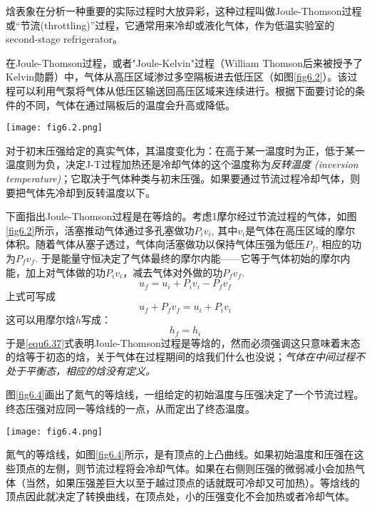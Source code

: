 焓表象在分析一种重要的实际过程时大放异彩，这种过程叫做Joule-Thomson过程或“节流(throttling)”过程，它通常用来冷却或液化气体，作为低温实验室的second-stage refrigerator。

在Joule-Thomson过程，或者"Joule-Kelvin"过程（William Thomson后来被授予了Kelvin勋爵）中，气体从高压区域渗过多空隔板进去低压区（如图\ref{fig6.2}）。该过程可以利用气泵将气体从低压区输送回高压区域来连续进行。根据下面要讨论的条件的不同，气体在通过隔板后的温度会升高或降低。

{
	\centering
	\texttt{[image: fig6.2.png]}
	\label{fig6.2}
}

对于初末压强给定的真实气体，其温度变化为：在高于某一温度时为正，低于某一温度则为负，决定J-T过程加热还是冷却气体的这个温度称为{\it 反转温度 (inversion temperature)}；它取决于气体种类与初末压强。如果要通过节流过程冷却气体，则要把气体先冷却到反转温度以下。

下面指出Joule-Thomson过程是在等焓的。考虑1摩尔经过节流过程的气体，如图\ref{fig6.2}所示，活塞推动气体通过多孔塞做功$P_i v_i$, 其中$v_i$是气体在高压区域的摩尔体积。随着气体从塞子透过，气体向活塞做功以保持气体压强为低压$P_f$, 相应的功为$P_f v_f$. 于是能量守恒决定了气体最终的摩尔内能——它等于气体初始的摩尔内能，加上对气体做的功$P_i v_i$，减去气体对外做的功$P_f v_f$.
\begin{equation}
	u_f = u_i + P_i v_i - P_f v_f 
\label{equ6.35}
\end{equation}
上式可写成
\begin{equation}
	u_f + P_f v_f = u_i + P_i v_i 
\label{equ6.36}
\end{equation}
这可以用摩尔焓$h$写成：
\begin{equation}
	h_f = h_i 
\label{equ6.37}
\end{equation}
于是\eqref{equ6.37}式表明Joule-Thomson过程是等焓的，然而必须强调这只意味着末态的焓等于初态的焓，关于气体在过程期间的焓我们什么也没说；{\it 气体在中间过程不处于平衡态，相应的焓没有定义。}

图\ref{fig6.4}画出了氮气的等焓线，一组给定的初始温度与压强决定了一个节流过程。终态压强对应同一等焓线的一点，从而定出了终态温度。

{
    \centering
    \texttt{[image: fig6.4.png]}
    \label{fig6.4}
}

氮气的等焓线，如图\ref{fig6.4}所示，是有顶点的上凸曲线。如果初始温度和压强在这些顶点的左侧，则节流过程将会冷却气体。如果在右侧则压强的微弱减小会加热气体（当然，如果压强差巨大以至于越过顶点的话就既可冷却又可加热）。等焓线的顶点因此就决定了转换曲线，在顶点处，小的压强变化不会加热或者冷却气体。

